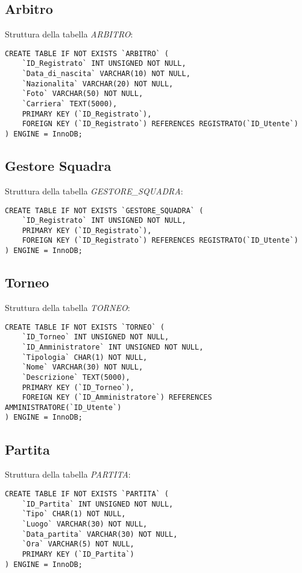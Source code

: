 \subsection{Arbitro}
Struttura della tabella \emph{ARBITRO}:

\begin{lstlisting}
CREATE TABLE IF NOT EXISTS `ARBITRO` (
	`ID_Registrato` INT UNSIGNED NOT NULL,
	`Data_di_nascita` VARCHAR(10) NOT NULL,
	`Nazionalita` VARCHAR(20) NOT NULL,
	`Foto` VARCHAR(50) NOT NULL,
	`Carriera` TEXT(5000),
	PRIMARY KEY (`ID_Registrato`),
	FOREIGN KEY (`ID_Registrato`) REFERENCES REGISTRATO(`ID_Utente`)
) ENGINE = InnoDB;
\end{lstlisting}

\subsection{Gestore Squadra}
Struttura della tabella \emph{GESTORE\_SQUADRA}:

\begin{lstlisting}
CREATE TABLE IF NOT EXISTS `GESTORE_SQUADRA` (
	`ID_Registrato` INT UNSIGNED NOT NULL,
	PRIMARY KEY (`ID_Registrato`),
	FOREIGN KEY (`ID_Registrato`) REFERENCES REGISTRATO(`ID_Utente`)
) ENGINE = InnoDB;
\end{lstlisting}

\newpage

\subsection{Torneo}
Struttura della tabella \emph{TORNEO}:

\begin{lstlisting}
CREATE TABLE IF NOT EXISTS `TORNEO` (
	`ID_Torneo` INT UNSIGNED NOT NULL,
	`ID_Amministratore` INT UNSIGNED NOT NULL,
	`Tipologia` CHAR(1) NOT NULL,
	`Nome` VARCHAR(30) NOT NULL,
	`Descrizione` TEXT(5000),
	PRIMARY KEY (`ID_Torneo`),
	FOREIGN KEY (`ID_Amministratore`) REFERENCES AMMINISTRATORE(`ID_Utente`)
) ENGINE = InnoDB;
\end{lstlisting}

\subsection{Partita}
Struttura della tabella \emph{PARTITA}:

\begin{lstlisting}
CREATE TABLE IF NOT EXISTS `PARTITA` (
	`ID_Partita` INT UNSIGNED NOT NULL,
	`Tipo` CHAR(1) NOT NULL,
	`Luogo` VARCHAR(30) NOT NULL,
	`Data_partita` VARCHAR(30) NOT NULL,
	`Ora` VARCHAR(5) NOT NULL,
	PRIMARY KEY (`ID_Partita`)
) ENGINE = InnoDB;
\end{lstlisting}

